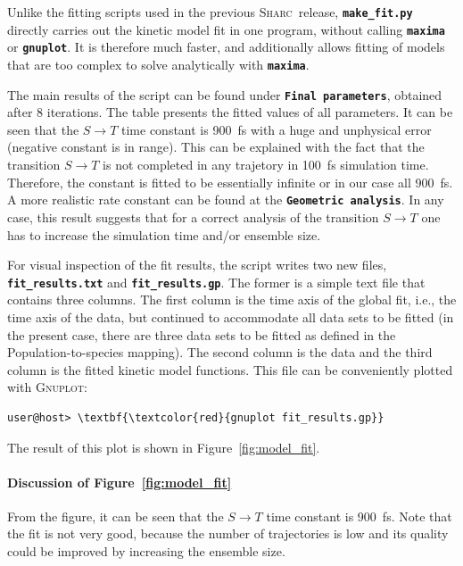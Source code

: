 \documentclass[a4paper,11pt,DIV=15,openany]{scrbook}
\newcommand{\sharc}{\textsc{Sharc}}
\newcommand{\ttt}[1]{\textbf{\texttt{#1}}}
\begin{document}
\normalsize

Unlike the fitting scripts used in the previous \sharc\ release, \ttt{make\_fit.py} directly carries out the kinetic model fit in one program, without calling \ttt{maxima} or \ttt{gnuplot}.
It is therefore much faster, and additionally allows fitting of models that are too complex to solve analytically with \ttt{maxima}.

The main results of the script can be found under \ttt{Final parameters}, obtained after 8 iterations.
The table presents the fitted values of all parameters.
It can be seen that the $S\rightarrow T$ time constant is 900~fs with a huge and unphysical error (negative constant is in range). This can be explained with the fact that the transition $S\rightarrow T$ is not completed in any trajetory in 100~fs simulation time. Therefore, the constant is fitted to be essentially infinite or in our case all 900~fs. A more realistic rate constant can be found at the \ttt{Geometric analysis}. In any case, this result suggests that for a correct analysis of the transition $S\rightarrow T$ one has to increase the simulation time and/or ensemble size.

For visual inspection of the fit results, the script writes two new files, \ttt{fit\_results.txt} and \ttt{fit\_results.gp}.
The former is a simple text file that contains three columns.
The first column is the time axis of the global fit, i.e., the time axis of the data, but continued to accommodate all data sets to be fitted (in the present case, there are three data sets to be fitted as defined in the Population-to-species mapping).
The second column is the data and the third column is the fitted kinetic model functions.
This file can be conveniently plotted with \textsc{Gnuplot}:
\begin{Verbatim}[commandchars=\\\{\}]
user@host> \textbf{\textcolor{red}{gnuplot fit_results.gp}}
\end{Verbatim}
The result of this plot is shown in Figure~\ref{fig:model_fit}.


\paragraph{Discussion of Figure~\ref{fig:model_fit}}

From the figure, it can be seen that the $S\rightarrow T$ time constant is 900~fs.
Note that the fit is not very good, because the number of trajectories is low and its quality could be improved by increasing the ensemble size.
\end{document}

